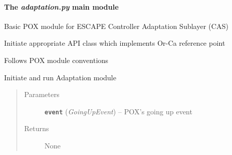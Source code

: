 \documentclass[letterpaper,10pt,english]{sphinxmanual}
\begin{document}
\paragraph{The \emph{adaptation.py} main module}
\label{adaptation:the-adaptation-py-main-module}\label{adaptation:module-adaptation}\label{adaptation::doc}
Basic POX module for ESCAPE Controller Adaptation Sublayer (CAS)

Initiate appropriate API class which implements Or-Ca reference point

Follows POX module conventions

\begin{fulllineitems}
\label{adaptation:adaptation._start_layer}
Initiate and run Adaptation module
\begin{quote}\begin{description}
\item[{Parameters}] \leavevmode
\textbf{\texttt{event}} (\emph{GoingUpEvent}) -- POX's going up event

\item[{Returns}] \leavevmode
None

\end{description}\end{quote}

\end{fulllineitems}

\end{document}
